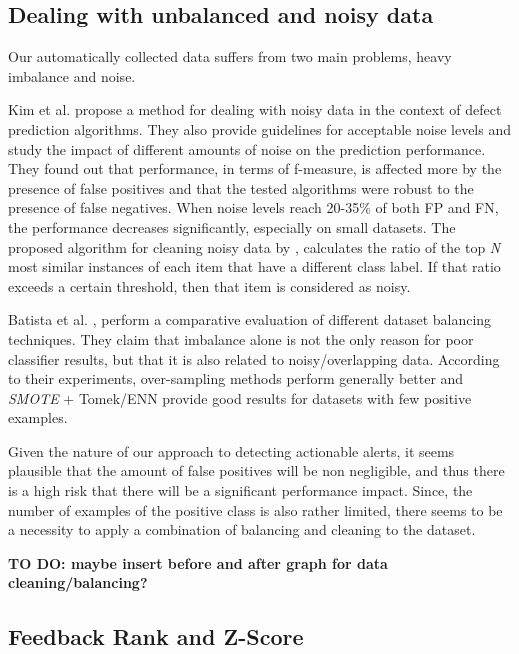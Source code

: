 \subsection{Dealing with unbalanced and noisy data}

Our automatically collected data suffers from two main problems, heavy imbalance and noise. 

Kim et al. \cite{noise_defect} propose a method for dealing with noisy data in the context of defect prediction algorithms. They also provide guidelines for acceptable noise levels and study the impact of different amounts of noise on the prediction performance.
They found out that performance, in terms of f-measure, is affected more by the presence of false positives and that the tested algorithms were robust to the presence of false negatives. When noise levels reach 20-35\% of both FP and FN, the performance decreases significantly, especially on small datasets.
The proposed algorithm for cleaning noisy data by \cite{noise_defect}, calculates the ratio of the top \textit{N} most similar instances of each item that have a different class label. If that ratio exceeds a certain threshold, then that item is considered as noisy.

Batista et al. \cite{balancing_comparison}, perform a comparative evaluation of different dataset balancing techniques. They claim that imbalance alone is not the only reason for poor classifier results, but that it is also related to noisy/overlapping data. According to their experiments, over-sampling methods perform generally better and \textit{SMOTE} + Tomek/ENN provide good results for datasets with few positive examples.

Given the nature of our approach to detecting actionable alerts, it seems plausible that the amount of false positives will be non negligible, and thus there is a high risk that there will be a significant performance impact. Since, the number of examples of the positive class is also rather limited, there seems to be a necessity to apply a combination of balancing and cleaning to the dataset.

\textbf{TO DO: maybe insert before and after graph for data cleaning/balancing?}

\subsection{Feedback Rank and Z-Score}



